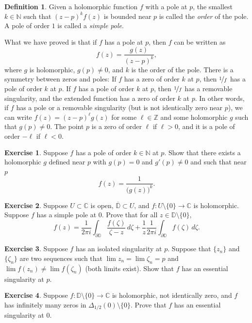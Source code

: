 \documentclass[12pt,openany]{book}
\newcommand{\C}{{\mathbb{C}}}
\newcommand{\Z}{{\mathbb{Z}}}
\newcommand{\N}{{\mathbb{N}}}
\newcommand{\D}{{\mathbb{D}}}
\newcommand{\myindex}[1]{#1\index{#1}}
\theoremstyle{plain}
\theoremstyle{remark}
\theoremstyle{definition}
\newtheorem{defn}[thm]{Definition}
\newenvironment{exbox}{%
    \def\FrameCommand{\vrule width 1pt \relax\hspace{10pt}}%
    \MakeFramed{\advance\hsize-\width\FrameRestore}%
}{%
    \endMakeFramed
}
\theoremstyle{exercise}
\newtheorem{exercise}{Exercise}[section]
\theoremstyle{example}
\begin{document}
\begin{defn}
Given a holomorphic function $f$ with a pole at $p$, the smallest $k \in \N$
such that ${(z-p)}^k f(z)$ is bounded near $p$ is called the
\emph{order} of the pole.
A pole of order $1$ is called a \emph{\myindex{simple pole}}.
\end{defn}

What we have proved is that if $f$
has a pole at $p$, then $f$ can be written as
\begin{equation*}
f(z) = \frac{g(z)}{{(z-p)}^k} ,
\end{equation*}
where $g$ is holomorphic, $g(p) \neq 0$, and $k$ is the order of the pole.
There is a symmetry between zeros and poles:
If $f$ has a zero of order $k$ at $p$, then $\nicefrac{1}{f}$ has a pole of
order $k$ at $p$.
If $f$ has a pole of order $k$ at $p$, then $\nicefrac{1}{f}$
has a removable singularity, and the extended function has a zero of order
$k$ at $p$.
In other words, if $f$ has a pole or a removable singularity (but is not
identically zero near $p$), we can write
$f(z) = {(z-p)}^\ell g(z)$ for some $\ell \in \Z$ and some holomorphic $g$ such
that $g(p) \neq 0$.
The point $p$ is a zero of order $\ell$ if $\ell
> 0$, and it is a pole of order $-\ell$ if $\ell < 0$.

\begin{exbox}
\begin{exercise}
Suppose $f$ has a pole of order $k \in \N$ at $p$.
Show that there exists a holomorphic $g$ defined near $p$
with $g(p) = 0$ and $g'(p) \neq 0$ and such that near $p$
\begin{equation*}
f(z) = \frac{1}{{\bigl(g(z)\bigr)}^k} .
\end{equation*}
\end{exercise}

\begin{exercise}
Suppose $U \subset \C$ is open, $\overline{\D} \subset U$,
and $f \colon U \setminus \{0\} \to \C$ is holomorphic.
Suppose $f$ has a simple pole at $0$.  Prove that for all
$z \in \D \setminus \{ 0 \}$,
\begin{equation*}
f(z) =
\frac{1}{2\pi i} \int_{\partial \D}
\frac{f(\zeta)}{\zeta-z} \, d\zeta
+
\frac{1}{z}
\frac{1}{2\pi i} \int_{\partial \D}
f(\zeta) \, d\zeta .
\end{equation*}
\end{exercise}

\begin{exercise}
Suppose $f$ has an isolated singularity at $p$.  Suppose that
$\{ z_n \}$ and $\{ \zeta_n \}$ are two sequences such that
$\lim z_n = \lim \zeta_n = p$ and $\lim f(z_n) \neq \lim f(\zeta_n)$
(both limits exist).
Show that $f$ has an essential singularity at $p$.
\end{exercise}

\begin{exercise}
Suppose $f \colon \D \setminus \{0\} \to \C$ is holomorphic,
not identically zero, and
$f$ has infinitely many zeros in $\Delta_{1/2}(0) \setminus \{ 0 \}$.
Prove that $f$ has an essential singularity at $0$.
\end{exercise}
\end{exbox}
\end{document}
